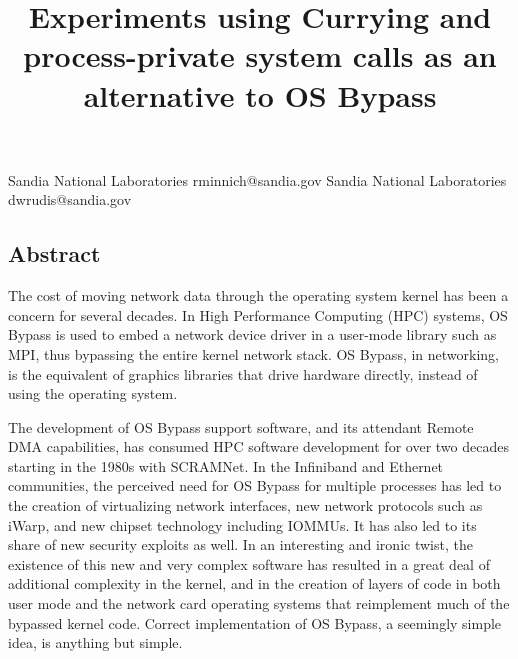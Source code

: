 \documentclass[a4,10pt,preprint]{sigplanconf}
\date{}
\begin{document}

           {Sandia National Laboratories}
           {rminnich@sandia.gov}
           {Sandia National Laboratories}
           {dwrudis@sandia.gov}
\title{\Large \bf Experiments using Currying and process-private system calls as an alternative to OS Bypass}
\maketitle
\thispagestyle{empty}
\pagestyle{empty}
\subsection*{Abstract}
The cost of moving network data through the operating system kernel has been a concern for several decades. In High Performance Computing (HPC) systems, OS Bypass is used to embed a network device driver in a user-mode library such as MPI, thus bypassing the entire kernel network stack. OS Bypass, in networking, is the equivalent of graphics libraries that drive
hardware directly, instead of using the operating system. 

The development of OS Bypass support software, and its attendant Remote DMA capabilities, has consumed HPC software development for over two decades starting in the 1980s with SCRAMNet\cite{scramnet}. In the Infiniband and Ethernet communities, the perceived need for OS Bypass for multiple processes has led to the creation of virtualizing
network interfaces, new network protocols such as iWarp, and new chipset technology including IOMMUs. It has also led to its share of new security exploits as well\cite{iommubug}. 
In an interesting and ironic twist, the existence of this new and very complex software 
has resulted in a great deal of additional complexity in the kernel, and in the creation of layers of code in both user mode and the network card operating systems that reimplement much of the  bypassed kernel code. 
Correct implementation of OS Bypass, a seemingly simple idea,  is anything but simple. 
\end{document}
